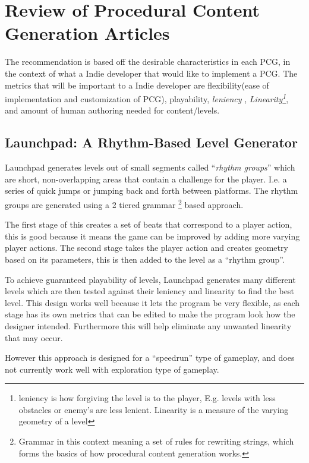 \documentclass{scrartcl}
\begin{document}
\section{Review of Procedural Content Generation Articles}


The recommendation is based off the desirable characteristics in each PCG, in the context of what a Indie developer that would like to implement a PCG. The metrics that will be important to a Indie developer are flexibility(ease of implementation and customization of PCG), playability, \textit{leniency} , \textit{Linearity\footnote{leniency is how forgiving the level is to the player, E.g. levels with less obstacles or enemy's are less lenient. Linearity is a measure of the varying geometry of a level}}, \cite{smith2010} and amount of human authoring needed for content/levels.

\subsection{Launchpad: A Rhythm-Based Level Generator}

Launchpad generates levels out of small segments called ``\textit{rhythm groups}''  which are short, non-overlapping areas that contain a challenge for the player. I.e. a series of quick jumps or jumping back and forth between platforms. The rhythm groups are generated using a 2 tiered grammar \footnote{Grammar in this context meaning a set of rules for rewriting strings, which forms the basics of how procedural content generation works\cite{shaker2015}.} based approach.

The first stage of this creates a set of beats that correspond to a player action, this is good because it means the game can be improved by adding more varying player actions.
The second stage takes the player action and creates geometry based on its parameters, this is then added to the level as a ``rhythm group''. 

To achieve guaranteed playability of levels, Launchpad generates many different levels which are then tested against their leniency and linearity to find the best level. This design works well because it lets the program be very flexible, as each stage has its own metrics that can be edited to make the program look how the designer intended. Furthermore this will help eliminate any unwanted linearity that may occur.

However this approach is designed for a ``speedrun''  type of gameplay, and does not currently work well with exploration type of gameplay.
\end{document}
